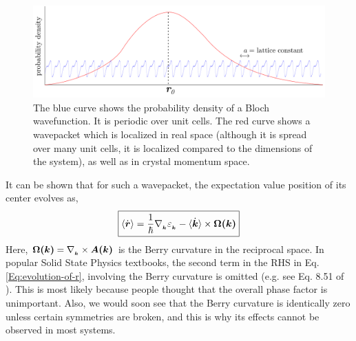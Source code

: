 \documentclass{revtex4-2}
\renewcommand\vec[1]{\ensuremath\boldsymbol{#1}} %
\begin{document}
\begin{figure}[h!]
	\centering
	\includegraphics[width=0.7\linewidth]{wavepacket-and-Bloch-wave}
	\caption{The blue curve shows the probability density of a Bloch wavefunction. It is periodic over unit cells. The red curve shows a wavepacket which is localized in real space (although it is spread over many unit cells, it is localized compared to the dimensions of the system), as well as in crystal momentum space.}
	\label{fig:wavepacket-and-bloch-wave}
\end{figure}

It can be shown \cite{ralph2020berry} that for such a wavepacket, the expectation value position of its center evolves as,
\begin{equation}\label{Eq:evolution-of-r}
	\boxed{\langle\dot{\vec{r}}\rangle = \frac{1}{\hbar} \nabla{_{_{\vec{k}}}} \varepsilon_{_{\vec{k}}} - \langle\dot{\vec{k}}\rangle \times \vec{\Omega(\vec{k})}}
\end{equation}
Here, $\vec{\Omega(\vec{k})} = \nabla_{_{\vec{k}}} \times \vec{A(\vec{k})}$ is the Berry curvature in the reciprocal space. In popular Solid State Physics textbooks, the second term in the RHS in Eq. \eqref{Eq:evolution-of-r}, involving the Berry curvature is omitted (e.g. see Eq. 8.51 of \cite{book:AshcroftMermin76}). This is most likely because people thought that the overall phase factor is unimportant. Also, we would soon see that the Berry curvature is identically zero unless certain symmetries are broken, and this is why its effects cannot be observed in most systems. 
\end{document}
